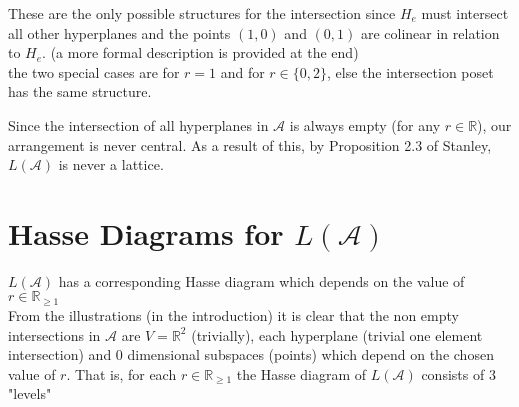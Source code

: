 \documentclass[12pt]{article}
\newcommand{\R}{\mathbb{R}}
\newenvironment{remark}[1][Remark]{\begin{trivlist}
\item[\hskip \labelsep {\bfseries #1}]}{\end{trivlist}}
\begin{document}
\begin{remark}
	These are the only possible structures for the intersection since $H_e$ must intersect all other hyperplanes and the points $(1,0)$ and $(0,1)$ are colinear in relation to $H_e$. (a more formal description is provided at the end)\\
	the two special cases are for $r=1$ and for $r\in \{0,2\}$, else the intersection poset has the same structure. 
\end{remark}
\begin{remark}
	Since the intersection of all hyperplanes in $\mathcal{A}$ is always empty (for any $r\in \R$), our arrangement is never central. As a result of this, by Proposition 2.3 of Stanley, $L(\mathcal{A})$ is never a lattice. 
\end{remark}
\newpage
\section{Hasse Diagrams for $L(\mathcal{A})$}
$L(\mathcal{A})$ has a corresponding Hasse diagram which depends on the value of $r\in \R_{\ge 1}$\\
From the illustrations (in the introduction) it is clear that the non empty intersections in $\mathcal{A}$ are $V=\R^2$ (trivially), each hyperplane (trivial one element intersection) and 0 dimensional subspaces (points) which depend on the chosen value of $r$. That is, for each $r\in \R_{\ge 1}$ the Hasse diagram of $L(\mathcal{A})$ consists of 3 "levels"\\
\\
\\
\hspace{1 cm}
\\
\end{document}
